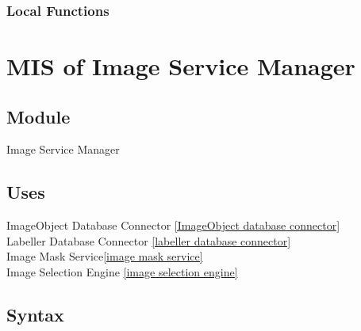 \documentclass[12pt, titlepage]{article}
\begin{document}
  \subsubsection{Local Functions}

   
  

\newpage


\section{MIS of Image Service Manager }\label{image service manager}
  
  
  
  \subsection{Module}
  
  Image Service Manager
  
  \subsection{Uses}
  
  ImageObject Database Connector \ref{ImageObject database connector}\\
  Labeller Database Connector \ref{labeller database connector}\\
  Image Mask Service\ref{image mask service}\\
  Image Selection Engine \ref{image selection engine}\\

  \subsection{Syntax}
\end{document}
